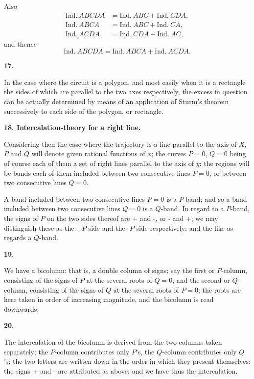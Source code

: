 \documentclass[12pt,a4paper]{article}
\theoremstyle{plain}
\theoremstyle{definition}
\begin{document}
Also
\begin{align*}
\text{Ind.}\ ABCDA &= \text{Ind.}\ ABC + \text{Ind.}\ CDA,\\
\text{Ind.}\ ABCA &= \text{Ind.}\ ABC + \text{Ind.}\ CA,\\
\text{Ind.}\ ACDA &= \text{Ind.}\ CDA + \text{Ind.}\ AC,
\end{align*}
and thence
\[
\text{Ind.}\ ABCDA = \text{Ind.}\ ABCA + \text{Ind.}\ ACDA.
\]

\textbf{17.}

In the case where the circuit is a polygon, and most easily when it is a rectangle the sides of which are parallel to the two axes respectively, the excess in question can be actually determined by means of an application of Sturm's theorem successively to each side of the polygon, or rectangle.

\newpage
\setcounter{page}{28}

\textbf{18. Intercalation-theory for a right line.}

Considering then the case where the trajectory is a line parallel to the axis of $X$, $P$ and $Q$ will denote given rational functions of $x$; the curves $P = 0$, $Q = 0$ being of course each of them a set of right lines parallel to the axis of $y$: the regions will be bands each of them included between two consecutive lines $P = 0$, or between two consecutive lines $Q = 0$.

A band included between two consecutive lines $P = 0$ is a $P$-band; and so a band included between two consecutive lines $Q = 0$ is a $Q$-band. In regard to a $P$-band, the signs of $P$ on the two sides thereof are + and -, or - and +; we may distinguish these as the +$P$ side and the -$P$ side respectively: and the like as regards a $Q$-band.

\textbf{19.}

We have a bicolumn: that is, a double column of signs; say the first or $P$-column, consisting of the signs of $P$ at the several roots of $Q = 0$; and the second or $Q$-column, consisting of the signs of $Q$ at the several roots of $P = 0$; the roots are here taken in order of increasing magnitude, and the bicolumn is read downwards.

\textbf{20.}

The intercalation of the bicolumn is derived from the two columns taken separately; the $P$-column contributes only $P$'s, the $Q$-column contributes only $Q$'s: the two letters are written down in the order in which they present themselves; the signs + and - are attributed as above: and we have thus the intercalation.
\end{document}

